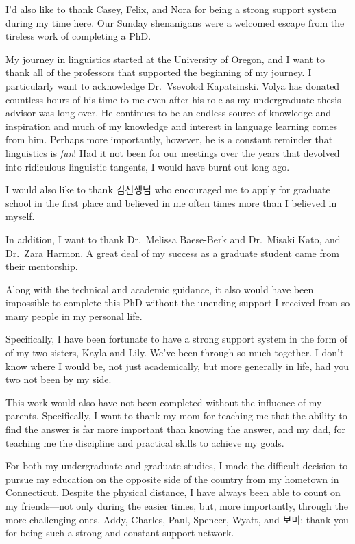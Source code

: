 \documentclass[
  12pt,
  letterpaper,
]{scrreprt}
\begin{document}
I'd also like to thank Casey, Felix, and Nora for being a strong support
system during my time here. Our Sunday shenanigans were a welcomed
escape from the tireless work of completing a PhD.

My journey in linguistics started at the University of Oregon, and I
want to thank all of the professors that supported the beginning of my
journey. I particularly want to acknowledge Dr.~Vsevolod Kapatsinski.
Volya has donated countless hours of his time to me even after his role
as my undergraduate thesis advisor was long over. He continues to be an
endless source of knowledge and inspiration and much of my knowledge and
interest in language learning comes from him. Perhaps more importantly,
however, he is a constant reminder that linguistics is \emph{fun}! Had
it not been for our meetings over the years that devolved into
ridiculous linguistic tangents, I would have burnt out long ago.

I would also like to thank 김선생님 who encouraged me to apply for
graduate school in the first place and believed in me often times more
than I believed in myself.

In addition, I want to thank Dr.~Melissa Baese-Berk and Dr.~Misaki Kato,
and Dr.~Zara Harmon. A great deal of my success as a graduate student
came from their mentorship.

Along with the technical and academic guidance, it also would have been
impossible to complete this PhD without the unending support I received
from so many people in my personal life.

Specifically, I have been fortunate to have a strong support system in
the form of of my two sisters, Kayla and Lily. We've been through so
much together. I don't know where I would be, not just academically, but
more generally in life, had you two not been by my side.

This work would also have not been completed without the influence of my
parents. Specifically, I want to thank my mom for teaching me that the
ability to find the answer is far more important than knowing the
answer, and my dad, for teaching me the discipline and practical skills
to achieve my goals.

For both my undergraduate and graduate studies, I made the difficult
decision to pursue my education on the opposite side of the country from
my hometown in Connecticut. Despite the physical distance, I have always
been able to count on my friends---not only during the easier times,
but, more importantly, through the more challenging ones. Addy, Charles,
Paul, Spencer, Wyatt, and 보미: thank you for being such a strong and
constant support network.
\end{document}
